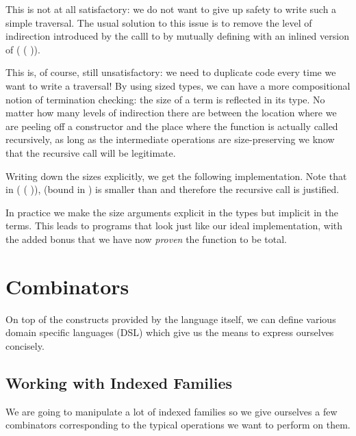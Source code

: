 
This is not at all satisfactory: we do not want to give up safety to write such a
simple traversal. The usual solution to this issue is to remove the level of
indirection introduced by the calll to  by mutually
defining with  an inlined version of
( ( )).


This is, of course, still unsatisfactory: we need to duplicate code every
time we want to write a traversal! By using sized types, we can have a more
compositional notion of termination checking: the size of a term is reflected
in its type. No matter how many levels of indirection there are between the
location where we are peeling off a constructor and the place where the function
is actually called recursively, as long as the intermediate operations are
size-preserving we know that the recursive call will be legitimate.

Writing down the sizes explicitly, we get the following implementation. Note
that in ( (  )),
 (bound in ) is smaller than  and therefore the recursive
call is justified.


In practice we make the size arguments explicit in the types but implicit in the
terms. This leads to programs that look just like our ideal implementation, with
the added bonus that we have now \emph{proven} the function to be total.


\section{Combinators}

On top of the constructs provided by the language itself, we can define various
domain specific languages (DSL) which give us the means to express ourselves
concisely.

\subsection{Working with Indexed Families}
\label{indexed-combinators}

We are going to manipulate a lot of indexed families so we give ourselves a few
combinators corresponding to the typical operations we want to perform on them.

